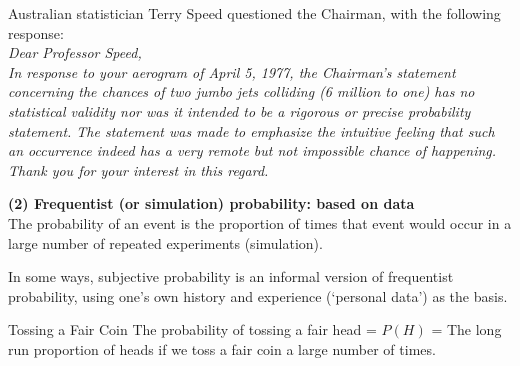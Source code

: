 \documentclass[t,xcolor=pdftex,dvipsnames,table]{beamer}
\begin{document}
\begin{frame}{}
Australian statistician Terry Speed questioned the Chairman, with the following response: \\

\vspace{.5cm}
{\it Dear Professor Speed, \\
In response to your aerogram of April 5, 1977, the
Chairman’s statement concerning the chances of two
jumbo jets colliding (6 million to one) has no statistical
validity nor was it intended to be a rigorous or precise
probability statement. The statement was made to
emphasize the intuitive feeling that such an occurrence
indeed has a very remote but not impossible chance of
happening.
Thank you for your interest in this regard.}
\end{frame}



\begin{frame}{}

{\bf (2) Frequentist (or simulation) probability: based on data} \\
The probability of an event is the proportion of times that event would occur in a large number of repeated experiments (simulation).

\vspace{.5cm}
In some ways, subjective probability is an informal version of frequentist probability, using one's own history and experience (`personal data') as the basis.

\vspace{.5cm}
\begin{block}{Tossing a Fair Coin}
The probability of tossing a fair head =  $P(H)$ = The long run proportion of heads if we toss a fair coin a large number of times.
\end{block}
\end{frame}
\end{document}
